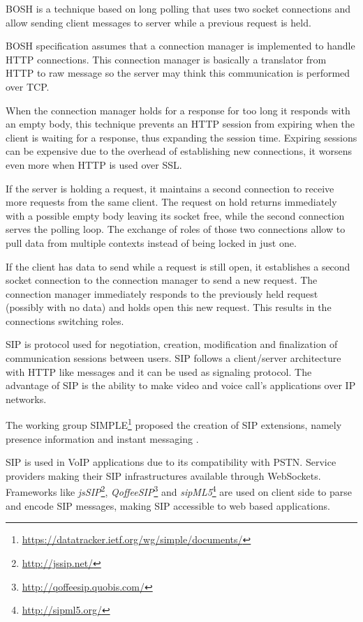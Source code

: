   \ac{BOSH}\cite{xep0124} is a technique based on long polling that uses two socket connections and allow sending client messages to server while a previous request is held.

  \ac{BOSH} specification assumes that a connection manager is implemented to handle \ac{HTTP} connections. This connection manager is basically a translator from \ac{HTTP} to raw message so the server may think this communication is performed over \ac{TCP}.

  When the connection manager holds for a response for too long it responds with an empty body, this technique prevents an \ac{HTTP} session from expiring when the client is waiting for a response, thus expanding the session time. Expiring sessions can be expensive due to the overhead of establishing new connections, it worsens even more when \ac{HTTP} is used over \ac{SSL}.

  If the server is holding a request, it maintains a second connection to receive more requests from the same client. The request on hold returns immediately with a possible empty body leaving its socket free, while the second connection serves the polling loop. The exchange of roles of those two connections allow to pull data from multiple contexts instead of being locked in just one.

  If the client has data to send while a request is still open, it establishes a second socket connection to the connection manager to send a new request. The connection manager immediately responds to the previously held request (possibly with no data) and holds open this new request. This results in the connections switching roles.

  \ac{SIP} \cite{rfc3261} is protocol used for negotiation, creation, modification and finalization of communication sessions between users. \ac{SIP} follows a client/server architecture with \ac{HTTP} like messages and it can be used as signaling protocol. The advantage of \ac{SIP} is the ability to make video and voice call's applications over \ac{IP} networks.

  The working group \ac{SIMPLE}\footnote{\url{https://datatracker.ietf.org/wg/simple/documents/}} proposed the creation of \ac{SIP} extensions, namely presence information \cite{rfc5263} and instant messaging \cite{rfc3428}.

  \ac{SIP} is used in \ac{VoIP} applications due to its compatibility with \ac{PSTN}. Service providers making their \ac{SIP} infrastructures available through WebSockets. Frameworks like \emph{jsSIP}\footnote{\url{http://jssip.net/}}, \emph{QoffeeSIP}\footnote{\url{http://qoffeesip.quobis.com/}} and \emph{sipML5}\footnote{\url{http://sipml5.org/}} are used on client side to parse and encode \ac{SIP} messages, making \ac{SIP} accessible to web based applications. 

